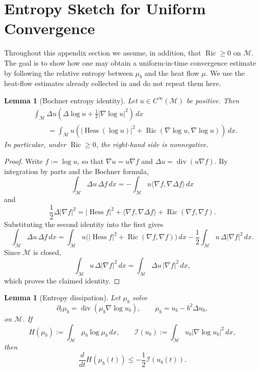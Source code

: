 \documentclass[11pt]{article}
\newtheorem{lemma}[theorem]{Lemma}
\theoremstyle{definition}
\newcommand{\divg}{\operatorname{div}}
\newcommand{\Hess}{\operatorname{Hess}}
\newcommand{\Ric}{\operatorname{Ric}}
\def\M{\mathcal M}
\begin{document}
\section{Entropy Sketch for Uniform Convergence}\label{app:entropy_convergence}

Throughout this appendix section we assume, in addition, that \(
\Ric\ge0\) on $\M$.
The goal is to show how one may obtain a uniform-in-time convergence
estimate by following the relative entropy between $\mu_b$ and the heat flow
$\mu$.  We use the heat-flow estimates already collected in
 and do not repeat them here.

\begin{lemma}[Bochner entropy identity]\label{lem:entropy_bochner}
Let $u\in C^\infty(\M)$ be positive. Then
\begin{align*}
&\int_\M \Delta u
\left(\Delta\log u+\frac12|\nabla\log u|^2\right)\,dx
\\
&\qquad =
\int_\M u\left(
|\Hess(\log u)|^2+\Ric(\nabla\log u,\nabla\log u)
\right)\,dx .
\end{align*}
In particular, under $\Ric\ge0$, the right-hand side is nonnegative.
\end{lemma}

\begin{proof}
Write $f:=\log u$, so that $\nabla u=u\nabla f$ and
$\Delta u=\divg(u\nabla f)$.  By integration by parts and the Bochner formula,
\[
\int_\M \Delta u\,\Delta f\,dx
=
-\int_\M u\langle\nabla f,\nabla\Delta f\rangle\,dx
\]
and
\[
\frac12\Delta|\nabla f|^2
=
|\Hess f|^2+\langle\nabla f,\nabla\Delta f\rangle
+\Ric(\nabla f,\nabla f).
\]
Substituting the second identity into the first gives
\[
\int_\M \Delta u\,\Delta f\,dx
=
\int_\M u\bigl(|\Hess f|^2+\Ric(\nabla f,\nabla f)\bigr)\,dx
-\frac12\int_\M u\,\Delta|\nabla f|^2\,dx .
\]
Since $\M$ is closed,
\[
\int_\M u\,\Delta|\nabla f|^2\,dx
=
\int_\M \Delta u\,|\nabla f|^2\,dx,
\]
which proves the claimed identity.
\end{proof}

\begin{lemma}[Entropy dissipation]\label{lem:entropy_fisher_bound}
Let $\mu_b$ solve
\[
\partial_t\mu_b=\divg(\mu_b\nabla\log u_b),
\qquad
\mu_b=u_b-b^2\Delta u_b,
\]
on $\M$.  If
\[
H(\mu_b):=\int_\M \mu_b\log\mu_b\,dx,
\qquad
\mathcal I(u_b):=\int_\M u_b|\nabla\log u_b|^2\,dx,
\]
then
\[
\frac{d}{dt}H(\mu_b(t))
\le
-\frac12\mathcal I(u_b(t)).
\]
\end{lemma}
\end{document}
